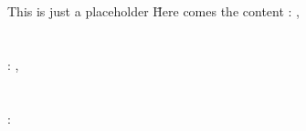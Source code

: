 \begin{tabbing}
  This is just a placeholder \= Here comes the content \kill
  : \> \textbf{\@coordinator@name},\\
  \> \@coordinator@firstaffiliation\\
  \> \@coordinator@secondaffiliation\\[2mm]
  : \> \textbf{\@director@name},\\
  \> \@director@firstaffiliation\\
  \> \@director@secondaffiliation\\[2mm]
  : \> \dates
\end{tabbing}
\makeatother

